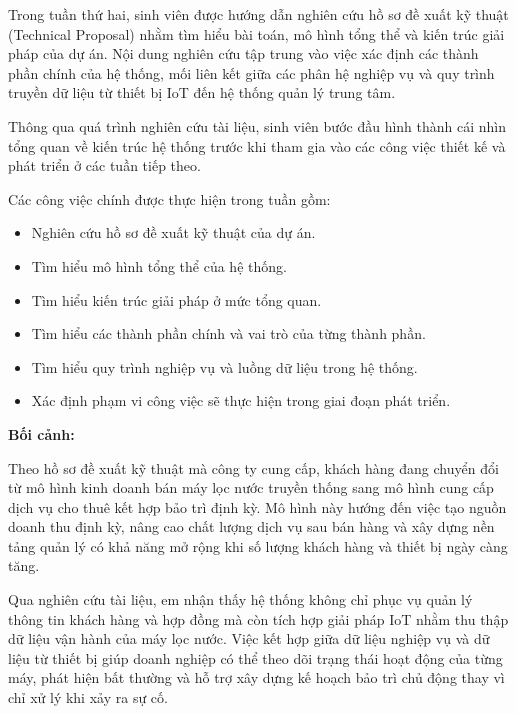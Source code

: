 
Trong tuần thứ hai, sinh viên được hướng dẫn nghiên cứu hồ sơ đề xuất kỹ thuật (Technical Proposal) nhằm tìm hiểu bài toán, mô hình tổng thể và kiến trúc giải pháp của dự án. Nội dung nghiên cứu tập trung vào việc xác định các thành phần chính của hệ thống, mối liên kết giữa các phân hệ nghiệp vụ và quy trình truyền dữ liệu từ thiết bị IoT đến hệ thống quản lý trung tâm.

Thông qua quá trình nghiên cứu tài liệu, sinh viên bước đầu hình thành cái nhìn tổng quan về kiến trúc hệ thống trước khi tham gia vào các công việc thiết kế và phát triển ở các tuần tiếp theo.

Các công việc chính được thực hiện trong tuần gồm:

\begin{itemize}
    \item Nghiên cứu hồ sơ đề xuất kỹ thuật của dự án.
    \item Tìm hiểu mô hình tổng thể của hệ thống.
    \item Tìm hiểu kiến trúc giải pháp ở mức tổng quan.
    \item Tìm hiểu các thành phần chính và vai trò của từng thành phần.
    \item Tìm hiểu quy trình nghiệp vụ và luồng dữ liệu trong hệ thống.
    \item Xác định phạm vi công việc sẽ thực hiện trong giai đoạn phát triển.
\end{itemize}


\textbf{Bối cảnh:}

Theo hồ sơ đề xuất kỹ thuật mà công ty cung cấp, khách hàng đang chuyển đổi từ mô hình kinh doanh bán máy lọc nước truyền thống sang mô hình cung cấp dịch vụ cho thuê kết hợp bảo trì định kỳ. Mô hình này hướng đến việc tạo nguồn doanh thu định kỳ, nâng cao chất lượng dịch vụ sau bán hàng và xây dựng nền tảng quản lý có khả năng mở rộng khi số lượng khách hàng và thiết bị ngày càng tăng.

Qua nghiên cứu tài liệu, em nhận thấy hệ thống không chỉ phục vụ quản lý thông tin khách hàng và hợp đồng mà còn tích hợp giải pháp IoT nhằm thu thập dữ liệu vận hành của máy lọc nước. Việc kết hợp giữa dữ liệu nghiệp vụ và dữ liệu từ thiết bị giúp doanh nghiệp có thể theo dõi trạng thái hoạt động của từng máy, phát hiện bất thường và hỗ trợ xây dựng kế hoạch bảo trì chủ động thay vì chỉ xử lý khi xảy ra sự cố.

